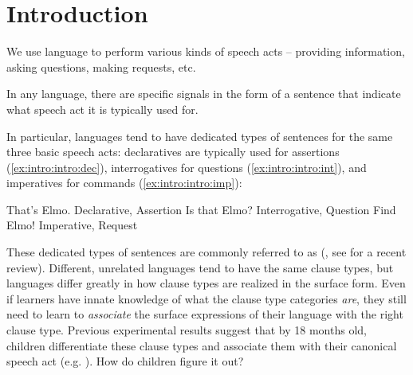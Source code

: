 {\chapter{Introduction}
\label{chap:introduction}
We use language to perform various kinds of speech acts -- providing information, asking questions, making requests, etc. 

In any language, there are specific signals in the form of a sentence that indicate what speech act it is typically used for. 


In particular, languages tend to have dedicated types of sentences for the same three basic speech acts: declaratives are typically used for assertions (\ref{ex:intro:intro:dec}), interrogatives for questions (\ref{ex:intro:intro:int}), and imperatives for commands (\ref{ex:intro:intro:imp}):

\bxl \label{ex:intro:intro:dec}
That's Elmo. \hfill Declarative, Assertion
\ex\label{ex:intro:intro:int} Is that Elmo? \hfill Interrogative, Question
\ex\label{ex:intro:intro:imp} Find Elmo! \hfill Imperative, Request
\exl
\eex


These dedicated types of sentences are commonly referred to as  (\citealt{sz1985speechact, konig2007, aikhenvald2016, portner2018}, see \cite{konig2020} for a recent review). Different, unrelated languages tend to have the same clause types, but languages differ greatly in how clause types are realized in the surface form. Even if learners have innate knowledge of what the clause type categories \emph{are}, they still need to learn to \emph{associate} the surface expressions of their language with the right clause type. Previous experimental results suggest that by 18 months old, children differentiate these clause types and associate them with their canonical speech act (e.g. \cite{casillas2017turn,marshmallowqueen}). How do children figure it out? %

}
